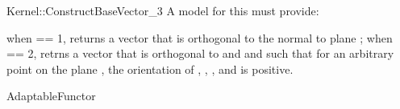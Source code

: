 \begin{ccRefFunctionObjectConcept}{Kernel::ConstructBaseVector_3}
A model for this must provide:


{when  == 1, returns a vector  that is orthogonal to the 
 normal  to plane ; when  == 2, retrns a vector 
  that is orthogonal to  and  and such that
 for an arbitrary point  on the plane , the orientation of
 , , , and  is positive.}

\ccRefines
AdaptableFunctor

\ccSeeAlso
{}  \\

\end{ccRefFunctionObjectConcept}
